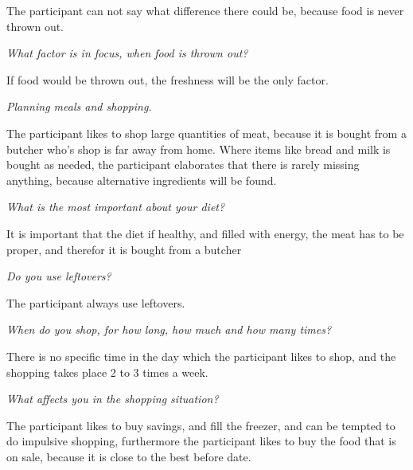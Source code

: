 The participant can not say what difference there could be, because food is never thrown out.

\emph{What factor is in focus, when food is thrown out?}

If food would be thrown out, the freshness will be the only factor.

\emph{Planning meals and shopping.}

The participant likes to shop large quantities of meat, because it is bought from a butcher who's shop is far away from home. Where items like bread and milk is bought as needed, the participant elaborates that there is rarely missing anything, because alternative ingredients will be found.

\emph{What is the most important about your diet?}

It is important that the diet if healthy, and filled with energy, the meat has to be proper, and therefor it is bought from a butcher

\emph{Do you use leftovers?}

The participant always use leftovers.

\emph{When do you shop, for how long, how much and how many times?}

There is no specific time in the day which the participant likes to shop, and the shopping takes place 2 to 3 times a week.

\emph{What affects you in the shopping situation?}

The participant likes to buy savings, and fill the freezer, and can be tempted to do impulsive shopping, furthermore the participant likes to buy the food that is on sale, because it is close to the best before date.